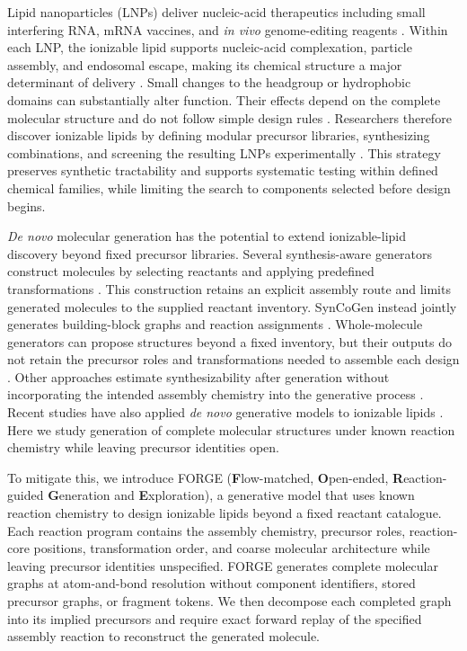 \documentclass{article}
\theoremstyle{definition}
\begin{document}
Lipid nanoparticles (LNPs) deliver nucleic-acid therapeutics including small interfering RNA, mRNA vaccines, and \textit{in vivo} genome-editing reagents
\citep{adams2018patisiran,polack2020safety,baden2021efficacy,gillmore2021crispr}.
Within each LNP, the ionizable lipid supports nucleic-acid complexation, particle assembly, and endosomal escape, making its chemical structure a major determinant of delivery
\citep{cullis2017lipid,hou2021lipid}.
Small changes to the headgroup or hydrophobic domains can substantially alter function. Their effects depend on the complete molecular structure and do not follow simple design rules
\citep{cheng2020selective,han2021ionizable,hatit2023nanoparticle}.
Researchers therefore discover ionizable lipids by defining modular precursor libraries, synthesizing combinations, and screening the resulting LNPs experimentally
\citep{akinc2008combinatorial,love2010lipidlike,li2024accelerating,xu2024agile}.
This strategy preserves synthetic tractability and supports systematic testing within defined chemical families, while limiting the search to components selected before design begins.

\textit{De novo} molecular generation has the potential to extend ionizable-lipid discovery beyond fixed precursor libraries. Several synthesis-aware generators construct molecules by selecting reactants and applying predefined transformations
\citep{gao2022amortized,koziarski2024rgfn,cretu2025synflownet}.
This construction retains an explicit assembly route and limits generated molecules to the supplied reactant inventory. SynCoGen instead jointly generates building-block graphs and reaction assignments
\citep{rekesh2025syncogen}. Whole-molecule generators can propose structures beyond a fixed inventory, but their outputs do not retain the precursor roles and transformations needed to assemble each design
\citep{qin2025defog,lee2025genmol}.
Other approaches estimate synthesizability after generation without incorporating the intended assembly chemistry into the generative process
\citep{gao2020synthesizability}.
Recent studies have also applied \textit{de novo} generative models to ionizable lipids
\citep{ou2024deep,maganti2026synthesis}.
Here we study generation of complete molecular structures under known reaction chemistry while leaving precursor identities open.

To mitigate this, we introduce FORGE (\textbf{F}low-matched, \textbf{O}pen-ended, \textbf{R}eaction-guided \textbf{G}eneration and \textbf{E}xploration), a generative model that uses known reaction chemistry to design ionizable lipids beyond a fixed reactant catalogue. Each reaction program contains the assembly chemistry, precursor roles, reaction-core positions, transformation order, and coarse molecular architecture while leaving precursor identities unspecified. FORGE generates complete molecular graphs at atom-and-bond resolution without component identifiers, stored precursor graphs, or fragment tokens. We then decompose each completed graph into its implied precursors and require exact forward replay of the specified assembly reaction to reconstruct the generated molecule.
\end{document}
